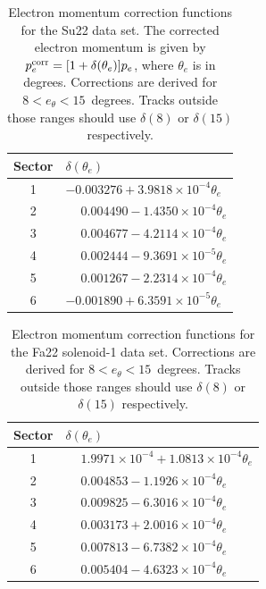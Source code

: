 \begin{table}[htbp]
\centering
\begin{tabular}{cl}
\toprule
Sector & $\delta(\theta_e)$ \\
\midrule
1 & $-0.003276 + 3.9818\times10^{-4}\theta_e$ \\
2 & $\phantom{-}0.004490 - 1.4350\times10^{-4}\theta_e$ \\
3 & $\phantom{-}0.004677 - 4.2114\times10^{-4}\theta_e$ \\
4 & $\phantom{-}0.002444 - 9.3691\times10^{-5}\theta_e$ \\
5 & $\phantom{-}0.001267 - 2.2314\times10^{-4}\theta_e$ \\
6 & $-0.001890 + 6.3591\times10^{-5}\theta_e$ \\
\bottomrule
\end{tabular}
\caption{Electron momentum correction functions for the Su22 data set. The corrected electron momentum is given by
$p_e^{\rm corr}=[1+\delta(\theta_e)]p_e$, where $\theta_e$ is in degrees. Corrections are derived for $8 < e_\theta < 15$~degrees. Tracks outside those ranges should use $\delta(8)$ or $\delta(15)$ respectively.}
\label{tab:Su22_electron_momentum_corrections}
\end{table}

\begin{table}[htbp]
\centering
\begin{tabular}{cl}
\toprule
Sector & $\delta(\theta_e)$ \\
\midrule
1 & $\phantom{-}1.9971\times10^{-4} + 1.0813\times10^{-4}\theta_e$ \\
2 & $\phantom{-}0.004853 - 1.1926\times10^{-4}\theta_e$ \\
3 & $\phantom{-}0.009825 - 6.3016\times10^{-4}\theta_e$ \\
4 & $\phantom{-}0.003173 + 2.0016\times10^{-4}\theta_e$ \\
5 & $\phantom{-}0.007813 - 6.7382\times10^{-4}\theta_e$ \\
6 & $\phantom{-}0.005404 - 4.6323\times10^{-4}\theta_e$ \\
\bottomrule
\end{tabular}
\caption{Electron momentum correction functions for the Fa22 solenoid-1 data set. Corrections are derived for $8 < e_\theta < 15$~degrees. Tracks outside those ranges should use $\delta(8)$ or $\delta(15)$ respectively.}
\label{tab:Fa22-1_electron_momentum_corrections}
\end{table}

